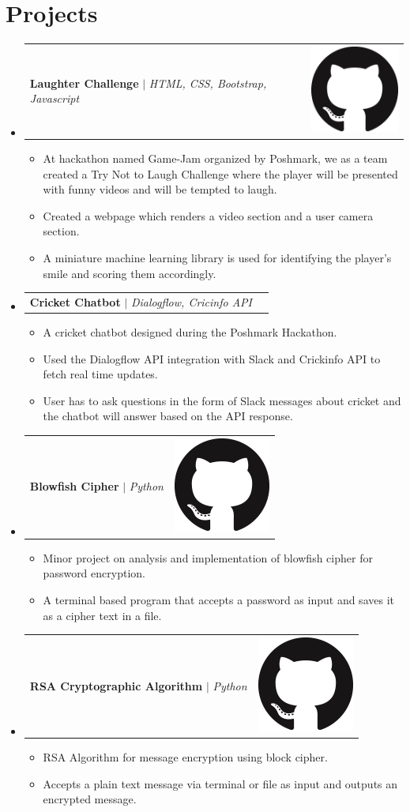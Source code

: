 \documentclass[letterpaper,11pt]{article}
\makeatletter
\newcommand{\resumeItem}[1]{
  \item\small{
    {#1 \vspace{-2pt}}
  }
}
\newcommand{\resumeProjectHeading}[2]{
    \item
    \begin{tabular*}{0.97\textwidth}{l@{\extracolsep{\fill}}r}
      \small#1 & #2 \\
    \end{tabular*}\vspace{-7pt}
}
\newcommand{\resumeSubHeadingListStart}{\begin{itemize}[leftmargin=0.15in, label={}]}
\newcommand{\resumeSubHeadingListEnd}{\end{itemize}}
\newcommand{\resumeItemListStart}{\begin{itemize}}
\newcommand{\resumeItemListEnd}{\end{itemize}\vspace{-5pt}}
\makeatother
\begin{document}
\section{Projects}
\resumeSubHeadingListStart
  \resumeProjectHeading
      {\textbf{Laughter Challenge} $|$ \emph{HTML, CSS, Bootstrap, Javascript}}{\href{https://github.com/harshmandalgi/laugh-challenge}{\includegraphics[scale=0.10]{github.png}}}
      \resumeItemListStart
        \resumeItem{At hackathon named Game-Jam organized by Poshmark, we as a team created a Try Not to Laugh Challenge where the player will be presented with funny videos and will be tempted to laugh.}
        \resumeItem{Created a webpage which renders a video section and a user camera section.}
        \resumeItem{A miniature machine learning library is used for identifying the player’s smile and scoring them accordingly.}
      \resumeItemListEnd
  \resumeProjectHeading
      {\textbf{Cricket Chatbot} $|$ \emph{Dialogflow, Cricinfo API}}{}
      \resumeItemListStart
        \resumeItem{A cricket chatbot designed during the Poshmark Hackathon.}
        \resumeItem{Used the Dialogflow API integration with Slack and Crickinfo API to fetch real time updates.}
        \resumeItem{User has to ask questions in the form of Slack messages about cricket and the chatbot will answer based on the API response.}
      \resumeItemListEnd
  \resumeProjectHeading
      {\textbf{Blowfish Cipher} $|$ \emph{Python}}{\href{https://github.com/iamibi/Blowfish-Cipher}{\includegraphics[scale=0.10]{github.png}}}
      \resumeItemListStart
        \resumeItem{Minor project on analysis and implementation of blowfish cipher for password encryption.}
        \resumeItem{A terminal based program that accepts a password as input and saves it as a cipher text in a file.}
      \resumeItemListEnd
  \resumeProjectHeading
      {\textbf{RSA Cryptographic Algorithm} $|$ \emph{Python}}{\href{https://github.com/iamibi/RSA-Cryptographic-Algorithm}{\includegraphics[scale=0.10]{github.png}}}
      \resumeItemListStart
        \resumeItem{RSA Algorithm for message encryption using block cipher.}
        \resumeItem{Accepts a plain text message via terminal or file as input and outputs an encrypted message.}
      \resumeItemListEnd
\resumeSubHeadingListEnd
\end{document}
